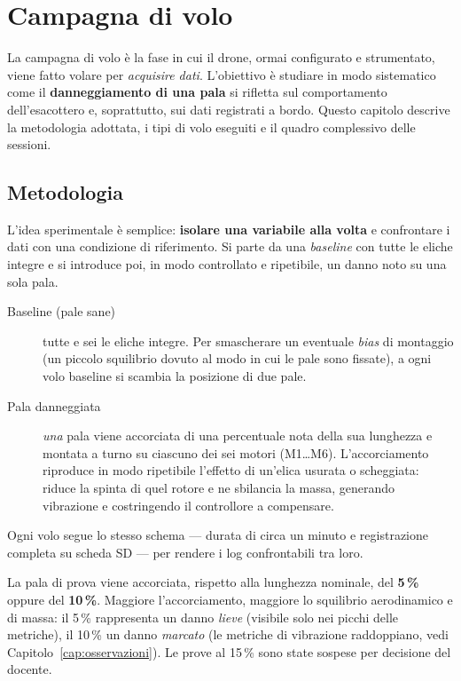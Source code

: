 \chapter{Campagna di volo}
\label{cap:campagna}

La campagna di volo \`e la fase in cui il drone, ormai configurato e strumentato,
viene fatto volare per \emph{acquisire dati}. L'obiettivo \`e studiare in modo
sistematico come il \textbf{danneggiamento di una pala} si rifletta sul
comportamento dell'esacottero e, soprattutto, sui dati registrati a bordo. Questo
capitolo descrive la metodologia adottata, i tipi di volo eseguiti e il quadro
complessivo delle sessioni.

\section{Metodologia}

L'idea sperimentale \`e semplice: \textbf{isolare una variabile alla volta} e
confrontare i dati con una condizione di riferimento. Si parte da una
\emph{baseline} con tutte le eliche integre e si introduce poi, in modo
controllato e ripetibile, un danno noto su una sola pala.

\begin{description}
  \item[Baseline (pale sane)] tutte e sei le eliche integre. Per smascherare un
        eventuale \emph{bias} di montaggio (un piccolo squilibrio dovuto al modo
        in cui le pale sono fissate), a ogni volo baseline si scambia la posizione
        di due pale.
  \item[Pala danneggiata] \emph{una} pala viene accorciata di una percentuale
        nota della sua lunghezza e montata a turno su ciascuno dei sei motori
        (M1\ldots M6). L'accorciamento riproduce in modo ripetibile l'effetto di
        un'elica usurata o scheggiata: riduce la spinta di quel rotore e ne
        sbilancia la massa, generando vibrazione e costringendo il controllore a
        compensare.
\end{description}

Ogni volo segue lo stesso schema --- durata di circa un minuto e registrazione
completa su scheda SD --- per rendere i log confrontabili tra loro.

\begin{notabox}
La pala di prova viene accorciata, rispetto alla lunghezza nominale, del
\textbf{5\,\%} oppure del \textbf{10\,\%}. Maggiore l'accorciamento, maggiore lo
squilibrio aerodinamico e di massa: il 5\,\% rappresenta un danno \emph{lieve}
(visibile solo nei picchi delle metriche), il 10\,\% un danno \emph{marcato} (le
metriche di vibrazione raddoppiano, vedi Capitolo~\ref{cap:osservazioni}). Le
prove al 15\,\% sono state sospese per decisione del docente.
\end{notabox}

